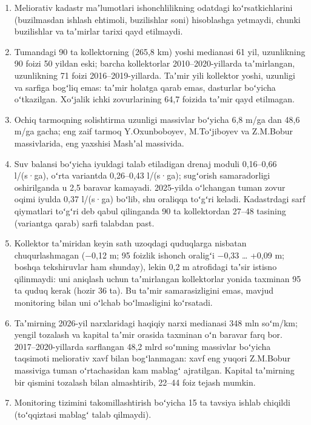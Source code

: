 \begin{enumerate}
\def\labelenumi{\arabic{enumi}.}
\tightlist
\item
  Meliorativ kadastr maʼlumotlari ishonchlilikning odatdagi
  koʻrsatkichlarini (buzilmasdan ishlash ehtimoli, buzilishlar soni)
  hisoblashga yetmaydi, chunki buzilishlar va taʼmirlar tarixi qayd
  etilmaydi.
\item
  Tumandagi 90 ta kollektorning (265,8 km) yoshi medianasi 61 yil,
  uzunlikning 90 foizi 50 yildan eski; barcha kollektorlar
  2010--2020-yillarda taʼmirlangan, uzunlikning 71 foizi
  2016--2019-yillarda. Taʼmir yili kollektor yoshi, uzunligi va sarfiga
  bogʻliq emas: taʼmir holatga qarab emas, dasturlar boʻyicha
  oʻtkazilgan. Xoʻjalik ichki zovurlarining 64,7 foizida taʼmir qayd
  etilmagan.
\item
  Ochiq tarmoqning solishtirma uzunligi massivlar boʻyicha 6,8 m/ga dan
  48,6 m/ga gacha; eng zaif tarmoq Y.Oxunboboyev, M.Toʻjiboyev va
  Z.M.Bobur massivlarida, eng yaxshisi Mashʼal massivida.
\item
  Suv balansi boʻyicha iyuldagi talab etiladigan drenaj moduli
  0,16--0,66 l/(s·ga), oʻrta variantda 0,26--0,43 l/(s·ga); sugʻorish
  samaradorligi oshirilganda u 2,5 baravar kamayadi. 2025-yilda
  oʻlchangan tuman zovur oqimi iyulda 0,37 l/(s·ga) boʻlib, shu oraliqqa
  toʻgʻri keladi. Kadastrdagi sarf qiymatlari toʻgʻri deb qabul
  qilinganda 90 ta kollektordan 27--48 tasining (variantga qarab) sarfi
  talabdan past.
\item
  Kollektor taʼmiridan keyin sath uzoqdagi quduqlarga nisbatan
  chuqurlashmagan (−0,12 m; 95 foizlik ishonch oraligʻi −0,33 \ldots{}
  +0,09 m; boshqa tekshiruvlar ham shunday), lekin 0,2 m atrofidagi
  taʼsir istisno qilinmaydi: uni aniqlash uchun taʼmirlangan
  kollektorlar yonida taxminan 95 ta quduq kerak (hozir 36 ta). Bu
  taʼmir samarasizligini emas, mavjud monitoring bilan uni oʻlchab
  boʻlmasligini koʻrsatadi.
\item
  Taʼmirning 2026-yil narxlaridagi haqiqiy narxi medianasi 348 mln
  soʻm/km; yengil tozalash va kapital taʼmir orasida taxminan oʻn
  baravar farq bor. 2017--2020-yillarda sarflangan 48,2 mlrd soʻmning
  massivlar boʻyicha taqsimoti meliorativ xavf bilan bogʻlanmagan: xavf
  eng yuqori Z.M.Bobur massiviga tuman oʻrtachasidan kam mablagʻ
  ajratilgan. Kapital taʼmirning bir qismini tozalash bilan almashtirib,
  22--44 foiz tejash mumkin.
\item
  Monitoring tizimini takomillashtirish boʻyicha 15 ta tavsiya ishlab
  chiqildi (toʻqqiztasi mablagʻ talab qilmaydi).
\end{enumerate}

